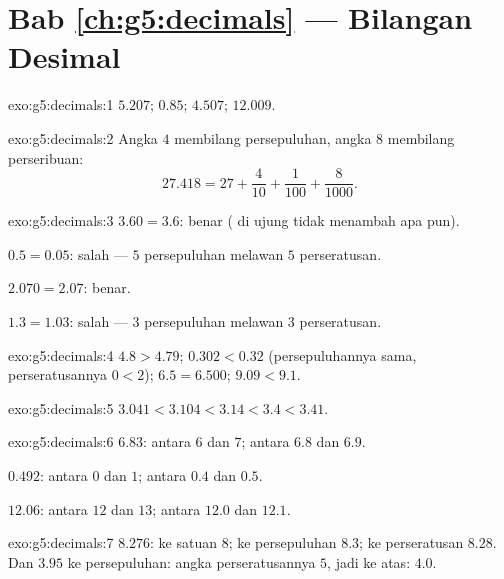 \section*{Bab \ref{ch:g5:decimals} --- Bilangan Desimal}

\begin{solution}{exo:g5:decimals:1}
$5.207$; \quad $0.85$; \quad $4.507$; \quad $12.009$.
\end{solution}

\begin{solution}{exo:g5:decimals:2}
Angka $4$ membilang persepuluhan, angka $8$ membilang perseribuan:
\[
27.418 = 27 + \frac{4}{10} + \frac{1}{100} + \frac{8}{1000}.
\]
\end{solution}

\begin{solution}{exo:g5:decimals:3}
$3.60 = 3.6$: benar ( di ujung tidak menambah apa pun).

$0.5 = 0.05$: salah --- $5$ persepuluhan melawan $5$ perseratusan.

$2.070 = 2.07$: benar.

$1.3 = 1.03$: salah --- $3$ persepuluhan melawan $3$ perseratusan.
\end{solution}

\begin{solution}{exo:g5:decimals:4}
$4.8 > 4.79$; \quad $0.302 < 0.32$ (persepuluhannya sama,
perseratusannya $0 < 2$); \quad $6.5 = 6.500$; \quad $9.09 < 9.1$.
\end{solution}

\begin{solution}{exo:g5:decimals:5}
$3.041 < 3.104 < 3.14 < 3.4 < 3.41$.
\end{solution}

\begin{solution}{exo:g5:decimals:6}
$6.83$: antara $6$ dan $7$; antara $6.8$ dan $6.9$.

$0.492$: antara $0$ dan $1$; antara $0.4$ dan $0.5$.

$12.06$: antara $12$ dan $13$; antara $12.0$ dan $12.1$.
\end{solution}

\begin{solution}{exo:g5:decimals:7}
$8.276$: ke satuan $8$; ke persepuluhan $8.3$; ke perseratusan
$8.28$. Dan $3.95$ ke persepuluhan: angka perseratusannya $5$, jadi
 ke atas: $4.0$.
\end{solution}


